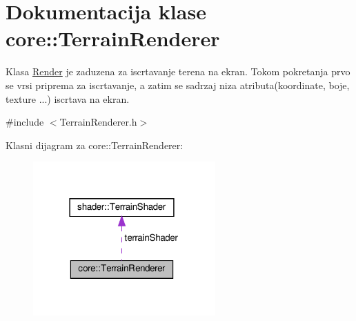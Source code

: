 \hypertarget{classcore_1_1TerrainRenderer}{}\section{Dokumentacija klase core\+:\+:Terrain\+Renderer}
\label{classcore_1_1TerrainRenderer}


Klasa \hyperlink{classcore_1_1Render}{Render} je zaduzena za iscrtavanje terena na ekran. Tokom pokretanja prvo se vrsi priprema za iscrtavanje, a zatim se sadrzaj niza atributa(koordinate, boje, texture ...) iscrtava na ekran.  




{\ttfamily \#include $<$Terrain\+Renderer.\+h$>$}



Klasni dijagram za core\+:\+:Terrain\+Renderer\+:
\nopagebreak
\begin{figure}[H]
\begin{center}
\leavevmode
\includegraphics[width=198pt]{classcore_1_1TerrainRenderer__coll__graph}
\end{center}
\end{figure}
